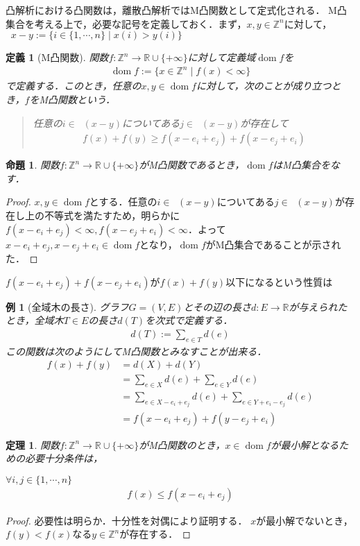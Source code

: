 \documentclass[a4paper]{jsarticle}
\newcommand{\Int}{\mathbb{Z}}
\DeclareMathOperator{\suppplus}{\mathrm{supp}^{+}}
\DeclareMathOperator{\suppminus}{\mathrm{supp}^{-}}
\DeclareMathOperator{\dom}{\mathrm{dom}}
\theoremstyle{break}
\newtheorem{theo}{定理}[section]
\newtheorem{defi}{定義}[section]
\newtheorem{prop}{命題}[section]
\newtheorem{proof}{証明}[section]
\newtheorem{example}{例}[section]
\begin{document}
凸解析における凸関数は，離散凸解析ではM凸関数として定式化される．
M凸集合を考える上で，必要な記号を定義しておく．まず，$x,y\in \Int^n$に対して，$\suppplus{x-y} := \{ i \in \{1,\cdots,n\} \mid x(i) > y(i) \}$
\begin{defi}[M凸関数]
  関数$f\colon \Int^n \to \mathbb{R}\cup \{+\infty\}$に対して定義域$\dom f$を
  \begin{align*}
    \dom f := \{ x \in \Int^n \mid f(x) < \infty \}
  \end{align*}
  で定義する．このとき，任意の$x,y\in \dom f$に対して，次のことが成り立つとき，$f$をM凸関数という．
  \begin{quote}
    任意の$i \in \suppplus(x-y)$についてある$j \in \suppminus(x-y)$が存在して
    \begin{align*}
      f(x) + f(y) \geq f(x-e_i+e_j) + f(x-e_j+e_i)
    \end{align*}   
  \end{quote}
\end{defi}
\begin{prop}
  関数$f\colon \Int^n \to \mathbb{R}\cup \{+\infty\}$がM凸関数であるとき，$\dom f$はM凸集合をなす．
\end{prop}
\begin{proof}
  $x,y\in \dom f$とする．任意の$i\in \suppplus(x-y)$についてある$j\in \suppminus(x-y)$が存在し上の不等式を満たすため，明らかに$f(x-e_i+e_j)<\infty ,f(x-e_j+e_i)<\infty$．よって$x-e_i+e_j,x-e_j+e_i\in \dom f$となり，$\dom f$がM凸集合であることが示された．
\end{proof}
$f(x-e_i+e_j) + f(x-e_j+e_i)$が$f(x)+f(y)$以下になるという性質は
\begin{example}[全域木の長さ] 
  グラフ$G=(V,E)$とその辺の長さ$d\colon E \to \mathbb{R}$が与えられたとき，全域木$T\in E$の長さ$d(T)$を次式で定義する．
  \begin{align*}
    d(T) := \sum_{e\in T} d(e)
  \end{align*}
  この関数は次のようにしてM凸関数とみなすことが出来る．
  \begin{align*}
    f(x) + f(y) & = d(X)+d(Y) \\
                & = \sum_{e\in X}d(e) + \sum_{e\in Y}d(e)  \\
                & = \sum_{e\in X-e_i+e_j}d(e) + \sum_{e\in Y+e_i-e_j}d(e)  \\
                & = f(x-e_i+e_j) + f(y-e_j+e_i)
  \end{align*}
\end{example}
\begin{theo}
  関数$f\colon \Int^n \to \mathbb{R} \cup \{+\infty\} $がM凸関数のとき，$x\in \dom f$が最小解となるための必要十分条件は，

  $\forall  i, j \in \{ 1, \cdots , n \}$
  \begin{align*}
    f(x) \leq f(x-e_i + e_j)
  \end{align*}
\end{theo}
\begin{proof}
  必要性は明らか．十分性を対偶により証明する．
  $x$が最小解でないとき，$f(y) < f(x)$なる$y\in \Int^n$が存在する．
\end{proof}
\end{document}

